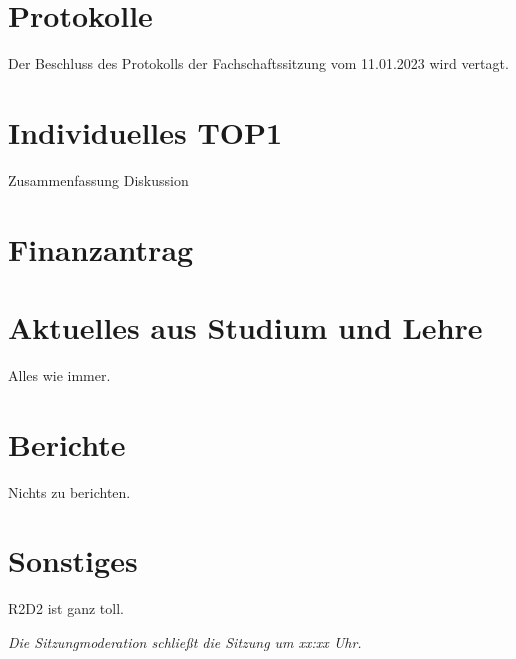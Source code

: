 \documentclass[11pt, twosided=true]{mathphys-protocol}
\renewcommand{\sende}{xx:xx Uhr}
\begin{document}
\maketitlepage



\section{Protokolle}
    Der Beschluss des Protokolls der Fachschaftssitzung vom 11.01.2023 wird vertagt.


\section{Individuelles TOP1}
Zusammenfassung Diskussion

\section{Finanzantrag}

\section{Aktuelles aus Studium und Lehre}
Alles wie immer.

\section{Berichte}
Nichts zu berichten.

\section{Sonstiges}
R2D2 ist ganz toll.

\emph{Die Sitzungmoderation schließt die Sitzung um \sende.}
\end{document}
